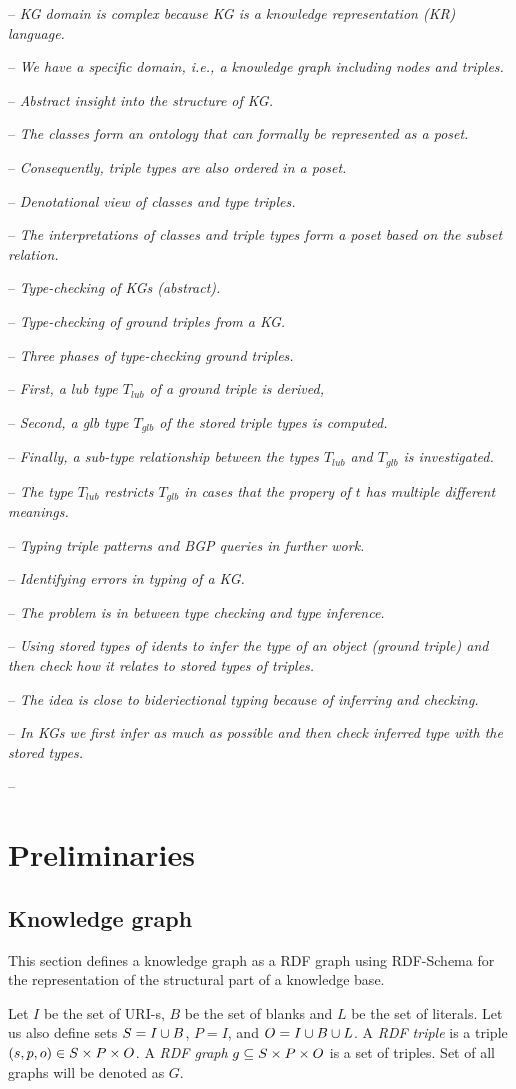 \documentclass[runningheads]{llncs}
\newcommand{\notes}[1]{\noindent\begin{small}-- \emph{#1}\\\end{small}}
\begin{document}
\notes{KG domain is complex because KG is a knowledge representation (KR) language.}
\notes{We have a specific domain, i.e., a knowledge graph including nodes and triples.}
\notes{Abstract insight into the structure of KG.}
\notes{The classes form an ontology that can formally be represented as a poset.}
\notes{Consequently, triple types are also ordered in a poset.}
\notes{Denotational view of classes and type triples.}
\notes{The interpretations of classes and triple types form a poset based on the subset relation.}

\notes{Type-checking of KGs (abstract).}
\notes{Type-checking of ground triples from a KG.}
\notes{Three phases of type-checking ground triples.}
\notes{First, a lub type $T_{lub}$ of a ground triple is derived,}
\notes{Second, a glb type $T_{glb}$ of the stored triple types is computed.}
\notes{Finally, a sub-type relationship between the types $T_{lub}$ and $T_{glb}$ is investigated.}
\notes{The type $T_{lub}$ restricts $T_{glb}$ in cases that the propery of $t$ has multiple different meanings.}
\notes{Typing triple patterns and BGP queries in further work.}
\notes{Identifying errors in typing of a KG.}

\notes{The problem is in between type checking and type inference.}
\notes{Using stored types of idents to infer the type of an object (ground triple) and then check how it relates to stored types of triples. }
\notes{The idea is close to bideriectional typing \cite{Dunfield2021} because of inferring and checking.}
\notes{In KGs we first infer as much as possible and then check inferred type with the stored types.}
\notes{}






\section{Preliminaries}


\subsection{Knowledge graph\label{sec:kg}}

This section defines a knowledge graph as a RDF graph \cite{rdf} using
RDF-Schema \cite{rdfschema} for the representation of the structural
part of a knowledge base. 

Let $I$ be the set of URI-s, $B$ be the set of blanks and $L$ be the
set of literals. Let us also define sets $S = I\cup\/B$, $P = I$, and
$O = I\cup\/B\cup\/L$. A \emph{RDF triple} is a triple
$(s,p,o)\in\/S\times\/P\times\/O$. A \emph{RDF graph}
$g\subseteq\/S\times\/P\times\/O$ is a set of triples. Set of all
graphs will be denoted as $G$.
\end{document}
